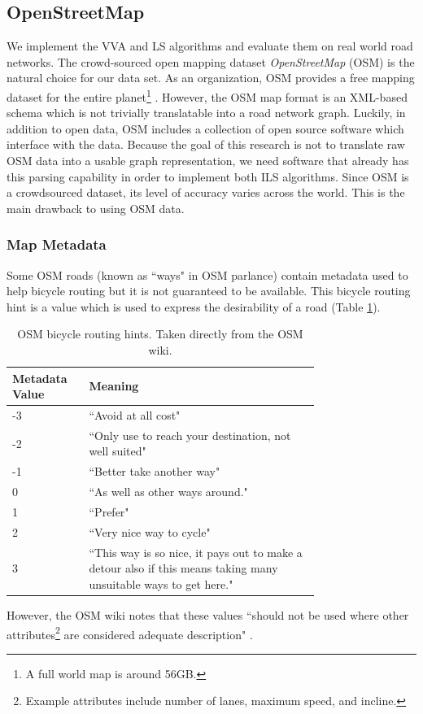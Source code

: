 \documentclass[11pt]{article}
\begin{document}
\subsection{OpenStreetMap}
We implement the VVA and LS algorithms and evaluate them on real world road networks. The crowd-sourced open mapping dataset \emph{OpenStreetMap} (OSM) is the natural choice for our data set. As an organization, OSM  provides a free mapping dataset for the entire planet\footnote{A full world map is around 56GB.} \cite{osm}. However, the OSM map format is an XML-based schema which is not trivially translatable into a road network graph. Luckily, in addition to open data, OSM includes a collection of open source software which interface with the data. Because the goal of this research is not to translate raw OSM data into a usable graph representation, we need software that already has this parsing capability in order to implement both ILS algorithms. Since OSM is a crowdsourced dataset, its level of accuracy varies across the world. This is the main drawback to using OSM data. 

\subsubsection{Map Metadata}
Some OSM roads (known as ``ways" in OSM parlance) contain metadata used to help bicycle routing but it is not guaranteed to be available. This bicycle routing hint is a value which is used to express the desirability of a road (Table \ref{tab:osm-hint}).  
\begin{table}[h]
\begin{center}
    \begin{tabular}{|l|p{0.75\linewidth}|}
        \hline
        \textbf{Metadata Value} & \textbf{Meaning} \\
        \hline
        -3 & ``Avoid at all cost" \\
        \hline
        -2 & ``Only use to reach your destination, not well suited" \\
        \hline
        -1 & ``Better take another way" \\
        \hline
        0 & ``As well as other ways around." \\
        \hline
        1 & ``Prefer" \\
        \hline
        2 & ``Very nice way to cycle" \\
        \hline
        3 & ``This way is so nice, it pays out to make a detour also if this means taking many unsuitable ways to get here." \\
        \hline
    \end{tabular}
\end{center}
\caption{OSM bicycle routing hints. Taken directly from the OSM wiki.}
\label{tab:osm-hint}
\end{table}
However, the OSM wiki notes that these values ``should not be used where other attributes\footnote{Example attributes include number of lanes, maximum speed, and incline.} are considered adequate description" \cite{osm}.
\end{document}
